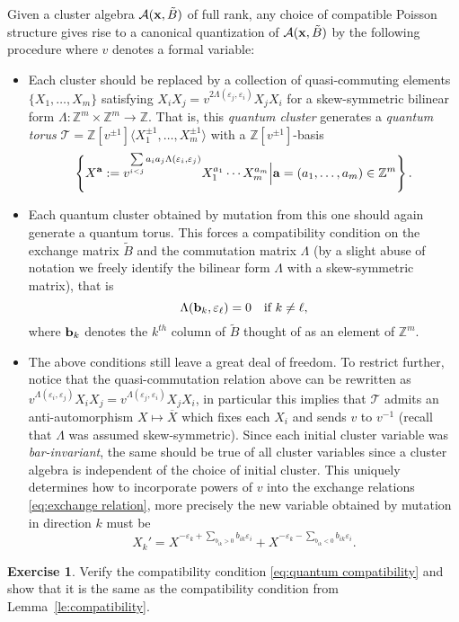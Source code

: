 \documentclass{amsart}
\theoremstyle{definition}
\newtheorem{exercise}[theorem]{Exercise}
\theoremstyle{remark}
\numberwithin{equation}{section}
\newcommand{\cA}{{\mathcal{A}}}
\newcommand{\cT}{{\mathcal{T}}}
\newcommand{\ba}{{\bf a}}
\newcommand{\bb}{{\bf b}}
\newcommand{\bx}{{\bf x}}
\newcommand{\ZZ}{{\mathbb{Z}}}
\begin{document}
  Given a cluster algebra $\cA(\bx,\tilde B)$ of full rank, any choice of compatible Poisson structure gives rise to a canonical quantization of $\cA(\bx,\tilde B)$ by the following procedure where $v$ denotes a formal variable:
  \begin{itemize}
    \item Each cluster should be replaced by a collection of quasi-commuting elements $\{X_1,\ldots,X_m\}$ satisfying $X_iX_j=v^{2\Lambda(\varepsilon_j,\varepsilon_i)}X_jX_i$ for a skew-symmetric bilinear form $\Lambda:\ZZ^m\times\ZZ^m\to\ZZ$.  That is, this \emph{quantum cluster} generates a \emph{quantum torus} $\cT=\ZZ[v^{\pm1}]\langle X_1^{\pm1},\ldots,X_m^{\pm1}\rangle$ with a $\ZZ[v^{\pm1}]$-basis 
    \[\left\{X^\ba:=v^{\sum\limits_{i<j}a_ia_j\Lambda(\varepsilon_i,\varepsilon_j)}X_1^{a_1}\cdots X_m^{a_m}\Big|\ba=(a_1,\ldots,a_m)\in\ZZ^m\right\}.\]
    \item Each quantum cluster obtained by mutation from this one should again generate a quantum torus.  This forces a compatibility condition on the exchange matrix $\tilde B$ and the commutation matrix $\Lambda$ (by a slight abuse of notation we freely identify the bilinear form $\Lambda$ with a skew-symmetric matrix), that is 
    \begin{equation}\label{eq:quantum compatibility}
      \Lambda(\bb_k,\varepsilon_\ell)=0\quad\text{if $k\ne\ell$,}
    \end{equation}
    where $\bb_k$ denotes the $k^{th}$ column of $\tilde B$ thought of as an element of $\ZZ^m$.
    \item The above conditions still leave a great deal of freedom.  To restrict further, notice that the quasi-commutation relation above can be rewritten as $v^{\Lambda(\varepsilon_i,\varepsilon_j)}X_iX_j=v^{\Lambda(\varepsilon_j,\varepsilon_i)}X_jX_i$, in particular this implies that $\cT$ admits an anti-automorphism $X\mapsto \overline{X}$ which fixes each $X_i$ and sends $v$ to $v^{-1}$ (recall that $\Lambda$ was assumed skew-symmetric).  Since each initial cluster variable was \emph{bar-invariant}, the same should be true of all cluster variables since a cluster algebra is independent of the choice of initial cluster.  This uniquely determines how to incorporate powers of $v$ into the exchange relations \eqref{eq:exchange relation}, more precisely the new variable obtained by mutation in direction $k$ must be
    \[X_k'=X^{-\varepsilon_k+\sum\limits_{b_{ik}>0}b_{ik}\varepsilon_i}+X^{-\varepsilon_k-\sum\limits_{b_{ik}<0}b_{ik}\varepsilon_i}.\]
  \end{itemize}
  \begin{exercise}
    Verify the compatibility condition \eqref{eq:quantum compatibility} and show that it is the same as the compatibility condition from Lemma~\ref{le:compatibility}.
  \end{exercise}
\end{document}

